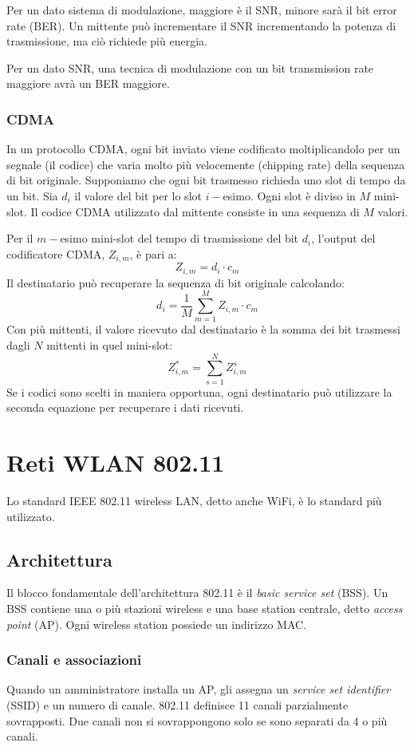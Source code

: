 \documentclass[11pt]{book}
\begin{document}
Per un dato sistema di modulazione, maggiore è il SNR, minore sarà il bit error rate (BER). Un mittente può incrementare 
il SNR incrementando la potenza di trasmissione, ma ciò richiede più energia.

Per un dato SNR, una tecnica di modulazione con un bit transmission rate maggiore avrà un BER maggiore.
\subsubsection{CDMA}
In un protocollo CDMA, ogni bit inviato viene codificato moltiplicandolo per un segnale (il codice) che varia molto più 
velocemente (chipping rate) della sequenza di bit originale. Supponiamo che ogni bit trasmesso richieda uno slot di tempo 
da un bit. Sia $d_i$ il valore del bit per lo slot $i-$esimo. Ogni slot è diviso in $M$ mini-slot. Il codice CDMA utilizzato 
dal mittente consiste in una sequenza di $M$ valori.

Per il $m-$esimo mini-slot del tempo di trasmissione del bit $d_i$, l'output del codificatore CDMA, $Z_{i,m}$, è pari a:
\begin{equation*}
    Z_{i,m}=d_i\cdot c_m
\end{equation*}
Il destinatario può recuperare la sequenza di bit originale calcolando:
\begin{equation*}
    d_i=\frac{1}{M}\sum_{m=1}^{M}Z_{i,m}\cdot c_m
\end{equation*}
Con più mittenti, il valore ricevuto dal destinatario è la somma dei bit trasmessi dagli $N$ mittenti in quel mini-slot:
\begin{equation*}
    Z^*_{i,m}=\sum_{s=1}^{N}Z^s_{i,m}
\end{equation*}
Se i codici sono scelti in maniera opportuna, ogni destinatario può utilizzare la seconda equazione per recuperare i dati
ricevuti.
\section{Reti WLAN 802.11}
Lo standard IEEE 802.11 wireless LAN, detto anche WiFi, è lo standard più utilizzato. 
\subsection{Architettura}
Il blocco fondamentale dell'architettura 802.11 è il \textit{basic service set} (BSS). Un BSS contiene una o più stazioni 
wireless e una base station centrale, detto \textit{access point} (AP). Ogni wireless station possiede un indirizzo MAC.
\subsubsection{Canali e associazioni}
Quando un amministratore installa un AP, gli assegna un \textit{service set identifier} (SSID) e un numero di canale. 802.11
definisce 11 canali parzialmente sovrapposti. Due canali non si sovrappongono solo se sono separati da 4 o più canali.
\end{document}
